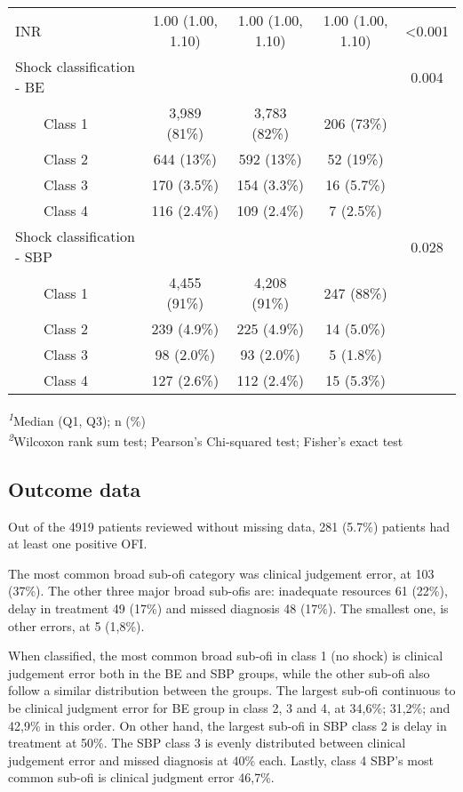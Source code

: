 \documentclass[
]{article}
\begin{document}
\begin{table}[!t]
\begin{tabular*}{\linewidth}{@{\extracolsep{\fill}}lcccc}
INR & 1.00 (1.00, 1.10) & 1.00 (1.00, 1.10) & 1.00 (1.00, 1.10) & <0.001 \\ 
Shock classification - BE &  &  &  & 0.004 \\ 
    Class 1 & 3,989 (81\%) & 3,783 (82\%) & 206 (73\%) &  \\ 
    Class 2 & 644 (13\%) & 592 (13\%) & 52 (19\%) &  \\ 
    Class 3 & 170 (3.5\%) & 154 (3.3\%) & 16 (5.7\%) &  \\ 
    Class 4 & 116 (2.4\%) & 109 (2.4\%) & 7 (2.5\%) &  \\ 
Shock classification - SBP &  &  &  & 0.028 \\ 
    Class 1 & 4,455 (91\%) & 4,208 (91\%) & 247 (88\%) &  \\ 
    Class 2 & 239 (4.9\%) & 225 (4.9\%) & 14 (5.0\%) &  \\ 
    Class 3 & 98 (2.0\%) & 93 (2.0\%) & 5 (1.8\%) &  \\ 
    Class 4 & 127 (2.6\%) & 112 (2.4\%) & 15 (5.3\%) &  \\ 
\bottomrule
\end{tabular*}
\begin{minipage}{\linewidth}
\textsuperscript{\textit{1}}Median (Q1, Q3); n (\%)\\
\textsuperscript{\textit{2}}Wilcoxon rank sum test; Pearson's Chi-squared test; Fisher's exact test\\
\end{minipage}
\end{table}

\hypertarget{outcome-data}{%
\subsection{Outcome data}\label{outcome-data}}

Out of the 4919 patients reviewed without missing data, 281 (5.7\%)
patients had at least one positive OFI.

The most common broad sub-ofi category was clinical judgement error, at
103 (37\%). The other three major broad sub-ofis are: inadequate
resources 61 (22\%), delay in treatment 49 (17\%) and missed diagnosis
48 (17\%). The smallest one, is other errors, at 5 (1,8\%).

When classified, the most common broad sub-ofi in class 1 (no shock) is
clinical judgement error both in the BE and SBP groups, while the other
sub-ofi also follow a similar distribution between the groups. The
largest sub-ofi continuous to be clinical judgment error for BE group in
class 2, 3 and 4, at 34,6\%; 31,2\%; and 42,9\% in this order. On other
hand, the largest sub-ofi in SBP class 2 is delay in treatment at 50\%.
The SBP class 3 is evenly distributed between clinical judgement error
and missed diagnosis at 40\% each. Lastly, class 4 SBP's most common
sub-ofi is clinical judgment error 46,7\%.
\end{document}
